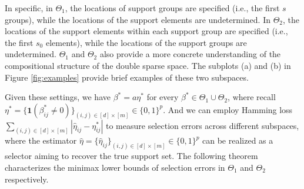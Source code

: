 \documentclass[12pt]{article}
\begin{document}
In specific, in ${\Theta}_1$, the locations of support groups are specified (i.e., the first $s$ groups), while the locations of the support elements are undetermined. 
In ${\Theta}_2$, the locations of the support elements within each support group are specified (i.e., the first $s_0$ elements), while the locations of the support groups are undetermined.
${\Theta}_1$ and ${\Theta}_2$ also provide a more concrete understanding of the compositional structure of the double sparse space.
The subplots (a) and (b) in Figure \ref{fig:examples} provide brief examples of these two subspaces.

Given these settings, we have $\beta^* = a \eta^*$ for every $\beta^* \in {\Theta}_1 \cup {\Theta}_2$, where recall $\eta^* = \{ \mathbf{1}(\beta^*_{ij} \ne 0)\}_{(i,j)\in [d]\times[m]} \in \{0,1\}^p$.
And we can employ Hamming loss $ \sum_{(i,j)\in [d]\times[m]} |\hat{\eta}_{ij}  - \eta^*_{ij}|$ to measure selection errors across different subspaces, where the estimator $\hat \eta = \{ \hat \eta_{ij}\}_{(i,j)\in [d]\times[m]} \in \{0,1\}^p$ can be realized as a selector aiming to recover the true support set. 
The following theorem characterizes the minimax lower bounds of selection errors in ${\Theta}_1$ and ${\Theta}_2$ respectively.

\end{document}
